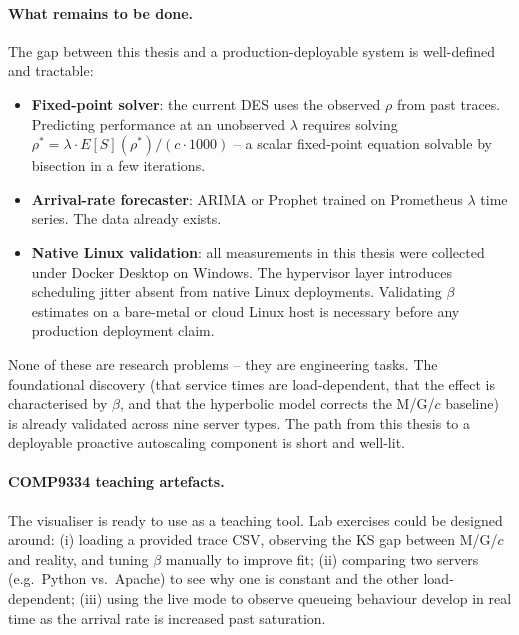 \paragraph{What remains to be done.}
The gap between this thesis and a production-deployable system is well-defined and tractable:
\begin{itemize}
    \item \textbf{Fixed-point solver}: the current DES uses the observed $\rho$ from past traces. Predicting performance at an unobserved $\lambda$ requires solving $\rho^* = \lambda \cdot E[S](\rho^*) / (c \cdot 1000)$ -- a scalar fixed-point equation solvable by bisection in a few iterations.
    \item \textbf{Arrival-rate forecaster}: ARIMA or Prophet trained on Prometheus $\lambda$ time series. The data already exists.
    \item \textbf{Native Linux validation}: all measurements in this thesis were collected under Docker Desktop on Windows. The hypervisor layer introduces scheduling jitter absent from native Linux deployments. Validating $\beta$ estimates on a bare-metal or cloud Linux host is necessary before any production deployment claim.
\end{itemize}

None of these are research problems -- they are engineering tasks. The foundational discovery (that service times are load-dependent, that the effect is characterised by $\beta$, and that the hyperbolic model corrects the M/G/$c$ baseline) is already validated across nine server types. The path from this thesis to a deployable proactive autoscaling component is short and well-lit.

\paragraph{COMP9334 teaching artefacts.}
The visualiser is ready to use as a teaching tool. Lab exercises could be designed around: (i) loading a provided trace CSV, observing the KS gap between M/G/$c$ and reality, and tuning $\beta$ manually to improve fit; (ii) comparing two servers (e.g.\ Python vs.\ Apache) to see why one is constant and the other load-dependent; (iii) using the live mode to observe queueing behaviour develop in real time as the arrival rate is increased past saturation.


